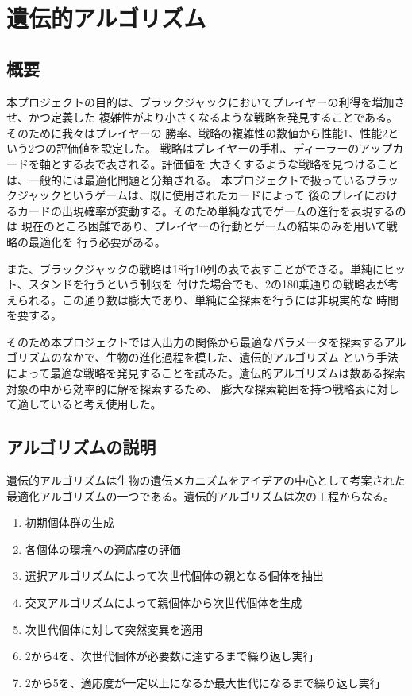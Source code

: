 \section{遺伝的アルゴリズム}
\subsection{概要}
本プロジェクトの目的は、ブラックジャックにおいてプレイヤーの利得を増加させ、かつ定義した
複雑性がより小さくなるような戦略を発見することである。そのために我々はプレイヤーの
勝率、戦略の複雑性の数値から性能1、性能2という2つの評価値を設定した。
戦略はプレイヤーの手札、ディーラーのアップカードを軸とする表で表される。評価値を
大きくするような戦略を見つけることは、一般的には最適化問題と分類される。
本プロジェクトで扱っているブラックジャックというゲームは、既に使用されたカードによって
後のプレイにおけるカードの出現確率が変動する。そのため単純な式でゲームの進行を表現するのは
現在のところ困難であり、プレイヤーの行動とゲームの結果のみを用いて戦略の最適化を
行う必要がある。

また、ブラックジャックの戦略は18行10列の表で表すことができる。単純にヒット、スタンドを行うという制限を
付けた場合でも、2の180乗通りの戦略表が考えられる。この通り数は膨大であり、単純に全探索を行うには非現実的な
時間を要する。

そのため本プロジェクトでは入出力の関係から最適なパラメータを探索するアルゴリズムのなかで、生物の進化過程を模した、遺伝的アルゴリズム
という手法によって最適な戦略を発見することを試みた。遺伝的アルゴリズムは数ある探索対象の中から効率的に解を探索するため、
膨大な探索範囲を持つ戦略表に対して適していると考え使用した。

\subsection{アルゴリズムの説明}
遺伝的アルゴリズムは生物の遺伝メカニズムをアイデアの中心として考案された最適化アルゴリズムの一つである。遺伝的アルゴリズムは次の工程からなる。
  \begin {enumerate}
    \item 初期個体群の生成
    \item 各個体の環境への適応度の評価
    \item 選択アルゴリズムによって次世代個体の親となる個体を抽出
    \item 交叉アルゴリズムによって親個体から次世代個体を生成
    \item 次世代個体に対して突然変異を適用
    \item 2から4を、次世代個体が必要数に達するまで繰り返し実行
    \item 2から5を、適応度が一定以上になるか最大世代になるまで繰り返し実行
  \end {enumerate}

